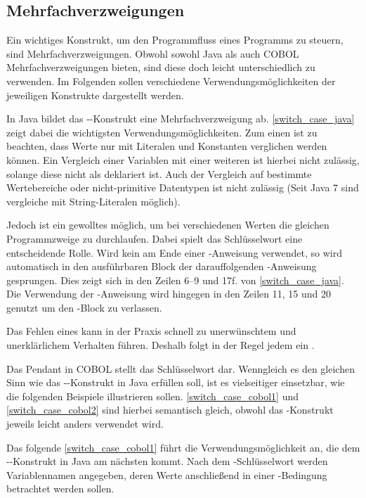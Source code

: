 \subsection{Mehrfachverzweigungen}\label{mehrfachverzweigungen}
Ein wichtiges Konstrukt, um den Programmfluss eines Programms zu steuern, sind Mehrfachverzweigungen. Obwohl sowohl Java als auch COBOL Mehrfachverzweigungen bieten, sind diese doch leicht unterschiedlich zu verwenden. Im Folgenden sollen verschiedene Verwendungsmöglichkeiten der jeweiligen Konstrukte dargestellt werden.

In Java bildet das --Konstrukt eine Mehrfachverzweigung ab. \autoref{switch_case_java} zeigt dabei die wichtigsten Verwendungsmöglichkeiten.
Zum einen ist zu beachten, dass Werte nur mit Literalen und Konstanten verglichen werden können. Ein Vergleich einer Variablen mit einer weiteren ist hierbei nicht zulässig, solange diese nicht als  deklariert ist. Auch der Vergleich auf bestimmte Wertebereiche oder nicht-primitive Datentypen ist nicht zulässig (Seit Java 7 sind vergleiche mit String-Literalen möglich).

Jedoch ist ein gewolltes  möglich, um bei verschiedenen Werten die gleichen Programmzweige zu durchlaufen. Dabei spielt das Schlüsselwort  eine entscheidende Rolle. Wird kein  am Ende einer -Anweisung verwendet, so wird automatisch in den ausführbaren Block der darauffolgenden -Anweisung gesprungen. Dies zeigt sich in den Zeilen 6--9 und 17f. von \autoref{switch_case_java}. Die Verwendung der -Anweisung wird hingegen in den Zeilen 11, 15 und 20 genutzt um den -Block zu verlassen.
 
Das Fehlen eines  kann in der Praxis schnell zu unerwünschtem und unerklärlichem Verhalten führen. Deshalb folgt in der Regel jedem  ein . 

Das Pendant in COBOL stellt das Schlüsselwort  dar. Wenngleich es den gleichen Sinn wie das --Konstrukt in Java erfüllen soll, ist es vielseitiger einsetzbar, wie die folgenden Beispiele illustrieren sollen. \autoref{switch_case_cobol1} und \autoref{switch_case_cobol2} sind hierbei semantisch gleich, obwohl das -Konstrukt jeweils leicht anders verwendet wird.

Das folgende \autoref{switch_case_cobol1} führt die Verwendungsmöglichkeit an, die dem --Konstrukt in Java am nächsten kommt. Nach dem -Schlüsselwort werden Variablennamen angegeben, deren Werte anschließend in einer -Bedingung betrachtet werden sollen.


